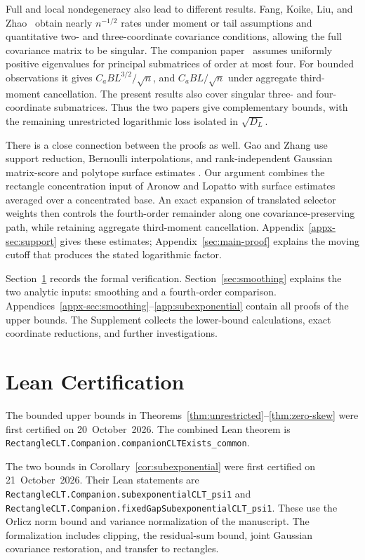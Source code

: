 \documentclass[11pt,letterpaper]{article}
\theoremstyle{remark}
\begin{document}
Full and local nondegeneracy also lead to different results.
Fang, Koike, Liu, and Zhao~\cite[Theorem~1.1]{FKLZ} obtain nearly
\(n^{-1/2}\) rates under moment or tail assumptions and quantitative
two- and three-coordinate covariance conditions, allowing the full
covariance matrix to be singular. The companion paper~\cite{Local}
assumes uniformly positive eigenvalues for principal submatrices of
order at most four. For bounded observations it gives
\(C_aBL^{3/2}/\sqrt n\), and \(C_aBL/\sqrt n\) under aggregate
third-moment cancellation. The present results also cover singular
three- and four-coordinate submatrices. Thus the two papers give
complementary bounds, with the remaining unrestricted logarithmic loss
isolated in \(\sqrt{D_L}\).

There is a close connection between the proofs as well. Gao and Zhang
use support reduction, Bernoulli interpolations, and rank-independent
Gaussian matrix-score and polytope surface estimates
\cite[Proposition~4 and Lemma~12]{GaoZhang}. Our argument combines
the rectangle concentration input of Aronow and Lopatto with surface
estimates averaged over a concentrated base. An exact expansion of
translated selector weights then controls the fourth-order remainder
along one covariance-preserving path, while retaining aggregate
third-moment cancellation. Appendix~\ref{appx-sec:support} gives these
estimates; Appendix~\ref{sec:main-proof} explains the moving cutoff
that produces the stated logarithmic factor.

Section~\ref{sec:lean-certification} records the formal verification.
Section~\ref{sec:smoothing} explains the two analytic inputs: smoothing
and a fourth-order comparison. Appendices~\ref{appx-sec:smoothing}--\ref{app:subexponential}
contain all proofs of the upper bounds. The Supplement collects the
lower-bound calculations, exact coordinate reductions, and further
investigations.


\section{Lean Certification}\label{sec:lean-certification}
The bounded upper bounds in Theorems~\ref{thm:unrestricted}--\ref{thm:zero-skew}
were first certified on 20~October~2026. The combined Lean theorem is
\nolinkurl{RectangleCLT.Companion.companionCLTExists_common}.

The two bounds in Corollary~\ref{cor:subexponential} were first certified
on 21~October~2026. Their Lean statements are
\nolinkurl{RectangleCLT.Companion.subexponentialCLT_psi1} and
\nolinkurl{RectangleCLT.Companion.fixedGapSubexponentialCLT_psi1}.
These use the Orlicz norm bound and variance normalization of the
manuscript. The formalization includes clipping, the residual-sum bound,
joint Gaussian covariance restoration, and transfer to rectangles.
\end{document}
